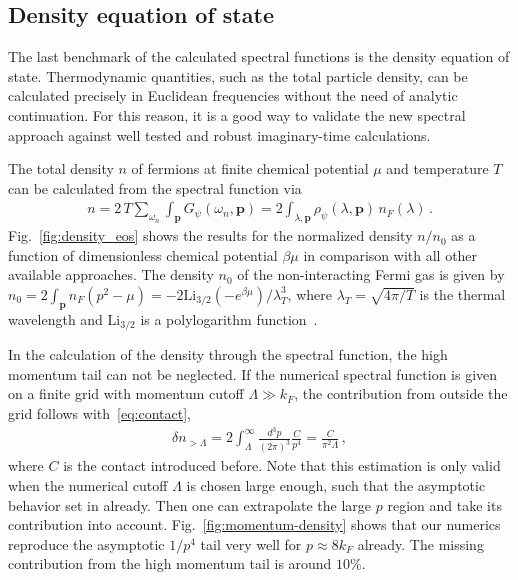 \subsection*{Density equation of state} \label{sec:density_eos}

The last benchmark of the calculated spectral functions is the density equation of state. Thermodynamic quantities, such as the total particle density, can be calculated precisely in Euclidean frequencies without the need of analytic continuation. For this reason, it is a good way to validate the new spectral approach against well tested and robust imaginary-time calculations. 

The total density $n$ of fermions at finite chemical potential $\mu$ and temperature $T$ can be calculated from the spectral function via~\cite{Schneider2009}
%
\begin{align} \label{eq:density}
	n = 2\,T\sum_{\omega_n}\int_{\bm{p}}G_{\psi}(\omega_n,\bm{p}) = 2\int_{\lambda,\bm{p}}\rho_{\psi}(\lambda,\bm{p})\,n_F(\lambda) \,.
\end{align}
%
Fig.~\ref{fig:density_eos} shows the results for the normalized density $n/n_0$ as a function of dimensionless chemical potential $\beta\mu$ in comparison with all other available approaches. The density $n_0$ of the non-interacting Fermi gas is given by $n_0=2\int_{\bm{p}}n_F(p^2-\mu)=-2\mathrm{Li}_{3/2}(-e^{\beta\mu})/\lambda_T^3$, where $\lambda_T=\sqrt{4\pi/T}$ is the thermal wavelength and $\mathrm{Li}_{3/2}$ is a polylogarithm function~\cite{Abramowitz1972}.

In the calculation of the density through the spectral function, the high momentum tail can not be neglected. If the numerical spectral function is given on a finite grid with momentum cutoff $\Lambda\gg k_F$, the contribution from outside the grid follows with~\eqref{eq:contact},
%
\begin{align}
	\delta n_{>\Lambda} = 2 \int_{\Lambda}^{\infty}\frac{d^3p}{(2\pi)^3} \frac{C}{p^4} = \frac{C}{\pi^2\Lambda} \,,
\end{align}
where $C$ is the contact introduced before. Note that this estimation is only valid when the numerical cutoff $\Lambda$ is chosen large enough, such that the asymptotic behavior set in already. Then one can extrapolate the large $p$ region and take its contribution into account. Fig.~\ref{fig:momentum-density} shows that our numerics reproduce the asymptotic $1/p^4$ tail very well for $p\approx 8k_F$ already. The missing contribution from the high momentum tail is around $10\%$.

